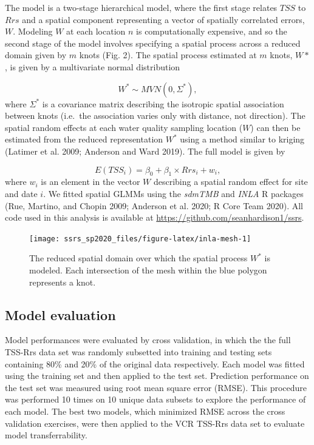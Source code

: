 \documentclass[11pt,]{article}
\begin{document}
The model is a two-stage hierarchical model, where the first stage
relates \(TSS\) to \(Rrs\) and a spatial component representing a vector
of spatially correlated errors, \(W\). Modeling \(W\) at each location
\(n\) is computationally expensive, and so the second stage of the model
involves specifying a spatial process across a reduced domain given by
\(m\) knots (Fig. 2). The spatial process estimated at \(m\) knots,
\(W*\), is given by a multivariate normal distribution

\[W^* \sim MVN(0, \Sigma^*),\] where \(\Sigma^*\) is a covariance matrix
describing the isotropic spatial association between knots (i.e.~the
association varies only with distance, not direction). The spatial
random effects at each water quality sampling location (\(W\)) can then
be estimated from the reduced representation \(W^*\) using a method
similar to kriging (Latimer et al. 2009; Anderson and Ward 2019). The
full model is given by

\[E(TSS_{i}) = \beta_0 + \beta_{1}\times Rrs_{i} + w_{i},\] where
\(w_{i}\) is an element in the vector \(W\) describing a spatial random
effect for site and date \(i\). We fitted spatial GLMMs using the
\emph{sdmTMB} and \emph{INLA} R packages (Rue, Martino, and Chopin 2009;
Anderson et al. 2020; R Core Team 2020). All code used in this analysis
is available at \url{https://github.com/seanhardison1/ssrs}.

\begin{figure}

{\centering \texttt{[image: ssrs\_sp2020\_files/figure-latex/inla-mesh-1]} 

}

\caption{The reduced spatial domain over which the spatial process $W^*$ is modeled. Each intersection of the mesh within the blue polygon represents a knot.}\label{fig:inla-mesh}
\end{figure}

\hypertarget{model-evaluation}{%
\subsection{Model evaluation}\label{model-evaluation}}

Model performances were evaluated by cross validation, in which the the
full TSS-Rrs data set was randomly subsetted into training and testing
sets containing 80\% and 20\% of the original data respectively. Each
model was fitted using the training set and then applied to the test
set. Prediction performance on the test set was measured using root mean
square error (RMSE). This procedure was performed 10 times on 10 unique
data subsets to explore the performance of each model. The best two
models, which minimized RMSE across the cross validation exercises, were
then applied to the VCR TSS-Rrs data set to evaluate model
transferrability.
\end{document}
